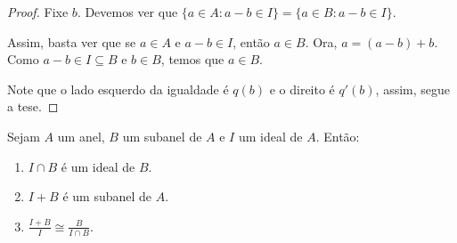 \begin{proof}
    Fixe $b$.
    Devemos ver que $\{a \in A: a-b\in I\}=\{a \in B: a-b\in I\}$.

    Assim, basta ver que se $a \in A$ e $a-b \in I$, então $a \in B$.
    Ora, $a=(a-b)+b$.
    Como $a-b \in I\subseteq B$ e $b \in B$, temos que $a \in B$.

    Note que o lado esquerdo da igualdade é $q(b)$ e o direito é $q'(b)$, assim, segue a tese.
\end{proof}

\begin{theorem}
    Sejam $A$ um anel, $B$ um subanel de $A$ e $I$ um ideal de $A$. Então:

    \begin{enumerate}[label=\alph*)]
        \item $I\cap B$ é um ideal de $B$.
        \item $I+B$ é um subanel de $A$.
        \item $\displaystyle \frac{I+B}{I}\cong \frac{B}{I\cap B}$.
    
    \end{enumerate}
\end{theorem}

